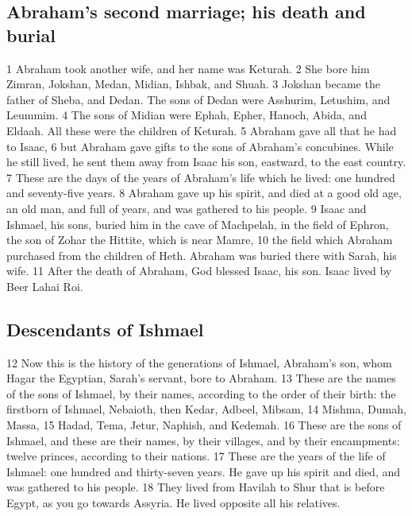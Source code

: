 \hypertarget{abrahams-second-marriage-his-death-and-burial}{%
\subsection{Abraham's second marriage; his death and
burial}\label{abrahams-second-marriage-his-death-and-burial}}

{1} Abraham took another wife, and her name was Keturah. {2} She bore
him Zimran, Jokshan, Medan, Midian, Ishbak, and Shuah. {3} Jokshan
became the father of Sheba, and Dedan. The sons of Dedan were Asshurim,
Letushim, and Leummim. {4} The sons of Midian were Ephah, Epher, Hanoch,
Abida, and Eldaah. All these were the children of Keturah. {5} Abraham
gave all that he had to Isaac, {6} but Abraham gave gifts to the sons of
Abraham's concubines. While he still lived, he sent them away from Isaac
his son, eastward, to the east country. {7} These are the days of the
years of Abraham's life which he lived: one hundred and seventy-five
years. {8} Abraham gave up his spirit, and died at a good old age, an
old man, and full of years, and was gathered to his people. {9} Isaac
and Ishmael, his sons, buried him in the cave of Machpelah, in the field
of Ephron, the son of Zohar the Hittite, which is near Mamre, {10} the
field which Abraham purchased from the children of Heth. Abraham was
buried there with Sarah, his wife. {11} After the death of Abraham, God
blessed Isaac, his son. Isaac lived by Beer Lahai Roi.

\hypertarget{descendants-of-ishmael}{%
\subsection{Descendants of Ishmael}\label{descendants-of-ishmael}}

{12} Now this is the history of the generations of Ishmael, Abraham's
son, whom Hagar the Egyptian, Sarah's servant, bore to Abraham. {13}
These are the names of the sons of Ishmael, by their names, according to
the order of their birth: the firstborn of Ishmael, Nebaioth, then
Kedar, Adbeel, Mibsam, {14} Mishma, Dumah, Massa, {15} Hadad, Tema,
Jetur, Naphish, and Kedemah. {16} These are the sons of Ishmael, and
these are their names, by their villages, and by their encampments:
twelve princes, according to their nations. {17} These are the years of
the life of Ishmael: one hundred and thirty-seven years. He gave up his
spirit and died, and was gathered to his people. {18} They lived from
Havilah to Shur that is before Egypt, as you go towards Assyria. He
lived opposite all his relatives.

